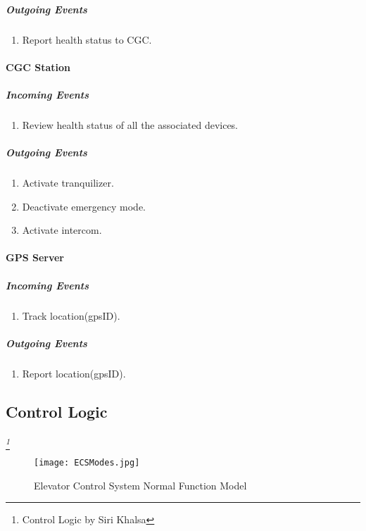 \documentclass[12pt]{article}
\begin{document}
			\subparagraph{Outgoing Events}
				\begin{enumerate}
                    \item Report health status to CGC. 
				\end{enumerate}

		\paragraph{CGC Station}
		\textit{}
			\subparagraph{Incoming Events}
				\begin{enumerate}
                    \item Review health status of all the associated devices.
				\end{enumerate}
				
			\subparagraph{Outgoing Events}
				\begin{enumerate}
					\item Activate tranquilizer. 
                    \item Deactivate emergency mode.
                    \item Activate intercom. 
				\end{enumerate}

		\paragraph{GPS Server}
		\textit{}
			\subparagraph{Incoming Events}
				\begin{enumerate}
					\item Track location(gpsID).
				\end{enumerate}
				
			\subparagraph{Outgoing Events}
				\begin{enumerate}
					\item Report location(gpsID).
				\end{enumerate}
				
		
		
		\subsection{Control Logic} \label{logic}%
		\paragraph{} \textit{ \footnote{Control Logic by Siri Khalsa}}

		\begin{figure}[H]
  			\centerline{\texttt{[image: ECSModes.jpg]}}
  			\caption{Elevator Control System Normal Function Model }
  			\label{fig:normal}
		\end{figure}
\end{document}

